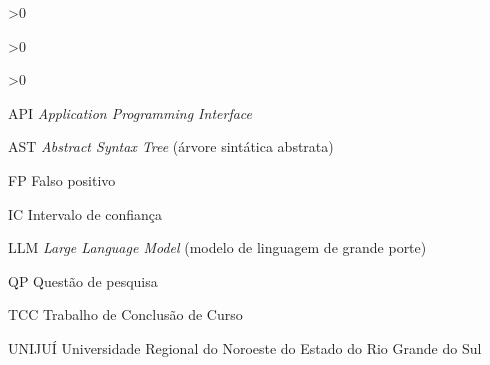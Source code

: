 \documentclass[
    12pt,               %
    oneside,            %
    a4paper,            %
    chapter=TITLE,      %
    section=TITLE,      %
    english,            %
    brazil,             %
    article             %
]{abntex2}
\begin{document}

\frenchspacing


\pretextual

\imprimircapa

\imprimirfolhaderosto

%     

\imprimirfolhadabanca



\ifnum{}>0
    \listoffigures*
    \cleardoublepage
    \newpage
\fi

\ifnum{}>0
    \listofquadros*
    \cleardoublepage
    \newpage
\fi

\ifnum{}>0
    \listoftables*
    \cleardoublepage
    \newpage
\fi

\begin{siglas}
    \item[API] \textit{Application Programming Interface}
    \item[AST] \textit{Abstract Syntax Tree} (árvore sintática abstrata)
    \item[FP] Falso positivo
    \item[IC] Intervalo de confiança
    \item[LLM] \textit{Large Language Model} (modelo de linguagem de grande porte)
    \item[QP] Questão de pesquisa
    \item[TCC] Trabalho de Conclusão de Curso
    \item[UNIJUÍ] Universidade Regional do Noroeste do Estado do Rio Grande do Sul
\end{siglas}
\end{document}
